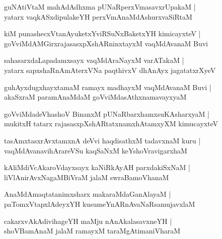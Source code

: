 \documentclass[twoside,12pt,openright]{book}
\newcounter{shloka}[chapter]
\begin{document}
\begin{shloka}%
guNAtiVtaM mahAdAdhxma pUNaRperxVmasavxrUpakaM |\\
yatarx vaqkASxdipulakeYH perxVmAnaMdAshurxvaSiRtaM 
\end{shloka}

\begin{shloka}%
kiM punashecxVtanAyuketxYviRSuNxBaketxYH kimicayxteV |\\
goVviMdAMGirxrajasasxpXshARninxtayxM vaqMdAvanaM Buvi 
\end{shloka}

\begin{shloka}%
sahasarxdaLapadamxsayx vaqMdAraNayxM varATakaM |\\
yatarx sapxshaRnAmAterxVNa paqthivxV dhAnAyx jagatatxrXyeV 
\end{shloka}

\begin{shloka}%
guhAyxdugxhayxtamaM ramayx madhayxM vaqMdAvanaM Buvi |\\
akaSxraM paramAnaMdaM goVviMdasAthxnamavayxyaM 
\end{shloka}

\begin{shloka}%
goVviMdadeVhashoV BinanxM pUNaRbarxhamxsuKAsharxyaM |\\
mukitxH tatarx rajasasxpXshARtatxnamxhAtamxyXM kimucayxteV
\end{shloka}

\begin{shloka}%
tasAmxtasxrAvxtamxnA deVvi haqdisathxM  tadavxnaM kuru |\\
vaqMdAvanavihArareVSu kaqSaNxM keYshoVravigarxhaM 
\end{shloka}

\begin{shloka}%
kAliMdiVcAkaroVdayxsayx kaNiRkAyAH parxdakiSxNaM |\\
liVlAnirAvxNagaMBiVraM jalaM swraBamoVhanaM 
\end{shloka}

\begin{shloka}%
AnaMdAmaqtatanimxsharx makaraMdaGanAlayaM |\\
paTomxVtapxlAdeyxYH kusumeYnARnAvaNaRsamujavxlaM 
\end{shloka}

\begin{shloka}%
cakarxvAkAdivihageYH maMju nAnAkalasavxneYH |\\
shoVBamAnaM jalaM ramayxM taraMgAtimaniVharaM 
\end{shloka}
\end{document}
